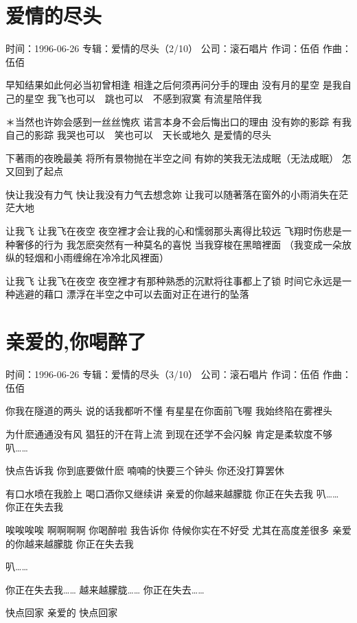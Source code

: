 \documentclass[UTF8,a4paper,oneside,twocolumn,12pt]{ctexbook}
\newcommand{\infopair}[2]{\textbullet #1：#2}
\newcommand{\zc}[1][伍佰]{\infopair{作词}{#1}}
\newcommand{\zq}[1][伍佰]{\infopair{作曲}{#1}}
\newcommand{\zj}[1]{\infopair{专辑}{#1}}
\newcommand{\sj}[1]{\infopair{时间}{#1}}
\newcommand{\gs}[1]{\infopair{公司}{#1}}
\newenvironment{info}{\begin{flushleft}\kaishu
	}
	{\end{flushleft}\normalsize\yahei\par}
\newenvironment{lyric}{
	}
{}
\begin{document}
\section{爱情的尽头}
\begin{info}
	\sj{1996-06-26}
	\zj{爱情的尽头（2/10）}
	\gs{滚石唱片}
	\zc
	\zq
\end{info}
\begin{lyric}
	早知结果如此何必当初曾相逢
	相逢之后何须再问分手的理由
	没有月的星空
	是我自己的星空
	我飞也可以　跳也可以　不感到寂寞
	有流星陪伴我

	＊当然也许妳会感到一丝丝愧疚
	诺言本身不会后悔出口的理由
	没有妳的影踪
	有我自己的影踪
	我哭也可以　笑也可以　天长或地久
	是爱情的尽头

	下著雨的夜晚最美
	将所有景物抛在半空之间
	有妳的笑我无法成眠（无法成眠）
	怎又回到了起点

	快让我没有力气
	快让我没有力气去想念妳
	让我可以随著落在窗外的小雨消失在茫茫大地

	让我飞
	让我飞在夜空
	夜空裡才会让我的心和懦弱那头离得比较远
	飞翔时伤悲是一种奢侈的行为
	我怎麽突然有一种莫名的喜悦 当我穿梭在黑暗裡面
	（我变成一朵放纵的轻烟和小雨缠绵在冷冷北风裡面）

	让我飞
	让我飞在夜空
	夜空裡才有那种熟悉的沉默将往事都上了锁
	时间它永远是一种逃避的藉口
	漂浮在半空之中可以去面对正在进行的坠落
\end{lyric}

\section{亲爱的,你喝醉了}
\begin{info}
	\sj{1996-06-26}
	\zj{爱情的尽头（3/10）}
	\gs{滚石唱片}
	\zc
	\zq
\end{info}
\begin{lyric}
	你我在隧道的两头
	说的话我都听不懂
	有星星在你面前飞喔
	我始终陷在雾裡头

	为什麽通通没有风
	猖狂的汗在背上流
	到现在还学不会闪躲
	肯定是柔软度不够
	叭……

	快点告诉我
	你到底要做什麽
	喃喃的快要三个钟头
	你还没打算罢休

	有口水喷在我脸上
	喝口酒你又继续讲
	亲爱的你越来越朦胧
	你正在失去我
	叭……
	你正在失去我

	唉唉唉唉
	啊啊啊啊
	你喝醉啦
	我告诉你
	侍候你实在不好受
	尤其在高度差很多
	亲爱的你越来越朦胧
	你正在失去我

	叭……

	你正在失去我……
	越来越朦胧……
	你正在失去……

	快点回家 亲爱的
	快点回家
\end{lyric}
\end{document}
